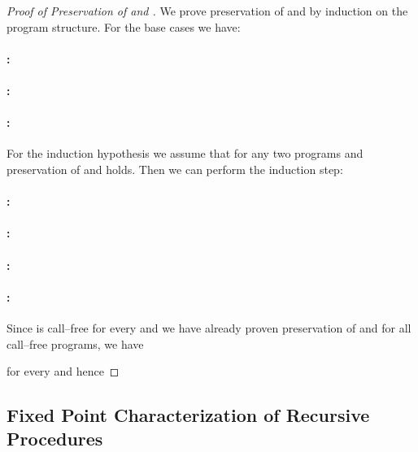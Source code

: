 \begin{proof}[Proof of Preservation of  and ]
We prove preservation of  and  by induction on the program structure.
For the base cases we have:
\paragraph{:}

\paragraph{:}

\paragraph{:}

For the induction hypothesis we assume that for any two programs  and  preservation of  and  holds.
Then we can perform the induction step:
\paragraph{:}

\paragraph{:}

\paragraph{:}

\paragraph{:}

Since  is call--free for every  and we have already proven preservation of  and  for all call--free programs, we have

for every  and hence

\end{proof}




\subsection{Fixed Point Characterization of Recursive Procedures}
\label{sec:app-fixed-point-sem}


